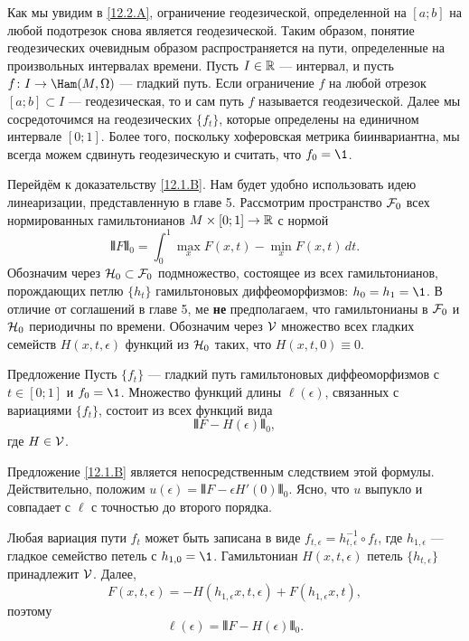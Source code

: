 Как мы увидим в \ref{12.2.A}, ограничение геодезической, определенной на $[a; b]$ на любой подотрезок снова является геодезической.
Таким образом, понятие геодезических очевидным образом распространяется на пути, определенные на произвольных интервалах времени.
Пусть $I\in \mathbb{R}$ --- интервал, и пусть $f\: I\to\Ham(M,\Omega)$ --- гладкий путь.
Если ограничение $f$ на любой отрезок $[a; b] \subset I$ --- геодезическая, то и сам путь $f$ называется геодезической.
Далее мы сосредоточимся на геодезических $\{f_t\}$, которые определены на единичном интервале $[0; 1]$.
Более того, поскольку хоферовская метрика биинвариантна, мы всегда можем сдвинуть геодезическую и считать, что $f_0 = \1$. 

Перейдём к доказательству \ref{12.1.B}.
Нам будет удобно использовать идею линеаризации, представленную в главе 5.
Рассмотрим пространство $\mathcal{F}_0$ всех нормированных гамильтонианов $M \times [0; 1] \to \mathbb{R}$
с нормой
\[\VERT F \VERT_0 = \int_0^1 \max_x F(x,t) - \min_x F(x,t)\, dt.\]
Обозначим через $\mathcal{H}_0 \subset \mathcal{F}_0$ подмножество, состоящее из всех гамильтонианов, порождающих петлю $\{h_t\}$ гамильтоновых диффеоморфизмов: $h_0 = h_1 = \1$.
В отличие от соглашений в главе 5,
ме \textbf{не} предполагаем, что гамильтонианы в $\mathcal{F}_0$ и $\mathcal{H}_0$ периодичны по времени.
Обозначим через $\mathcal{V}$ множество всех гладких семейств $H(x, t, \epsilon)$ функций из $\mathcal{H}_0$ таких, что $H(x, t, 0) \equiv 0$.

\begin{thm}{Предложение}\label{12.1.E}
Пусть $\{f_t\}$ --- гладкий путь гамильтоновых диффеоморфизмов с $t \in [0; 1]$ и $f_0 = \1$.
Множество функций длины $\ell(\epsilon)$, связанных с вариациями $\{f_t\}$, состоит из всех функций вида 
\[\VERT F - H(\epsilon)\VERT_0,\]
где $H\in\mathcal{V}$.
\end{thm}

Предложение \ref{12.1.B} является непосредственным следствием этой формулы.
Действительно, положим $u(\epsilon) = \VERT F - \epsilon H'(0)\VERT_0$.
Ясно, что $u$ выпукло и совпадает с $\ell$ с точностью до второго порядка.

Любая вариация пути $f_t$ может быть записана в виде $f_{t,\epsilon} = h_{t,\epsilon}^{-1}\circ f_t$, где $h_{1,\epsilon}$ --- гладкое семейство петель с $h_{1,0} = \1$.
Гамильтониан $H(x,t,\epsilon)$ петель $\{h_{t,\epsilon}\}$ принадлежит $\mathcal{V}$.
Далее, 
\[F(x, t, \epsilon) = -H(h_{1,\epsilon}x, t, \epsilon) + F(h_{1,\epsilon}x, t),\]
поэтому
\[\ell(\epsilon) = \VERT F - H(\epsilon)\VERT_0.\]
\qeds

